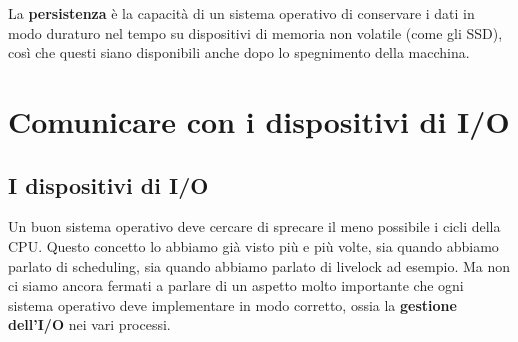 \documentclass[11pt, a4paper, titlepage, oneside]{scrbook}
\begin{document}
\begin{Definizione}[Persistenza]
\label{def-persistenza}
La \textbf{persistenza} è la capacità di un sistema operativo di conservare i dati in modo duraturo nel tempo su dispositivi di memoria non volatile (come gli SSD), così che questi siano disponibili anche dopo lo spegnimento della macchina.
\end{Definizione}

\section{Comunicare con i dispositivi di I/O}

\subsection{I dispositivi di I/O}

Un buon sistema operativo deve cercare di sprecare il meno possibile i cicli della CPU. Questo concetto lo abbiamo già visto più e più volte, sia quando abbiamo parlato di scheduling, sia quando abbiamo parlato di livelock ad esempio. Ma non ci siamo ancora fermati a parlare di un aspetto molto importante che ogni sistema operativo deve implementare in modo corretto, ossia la \textbf{gestione dell'I/O} nei vari processi. 
\end{document}
